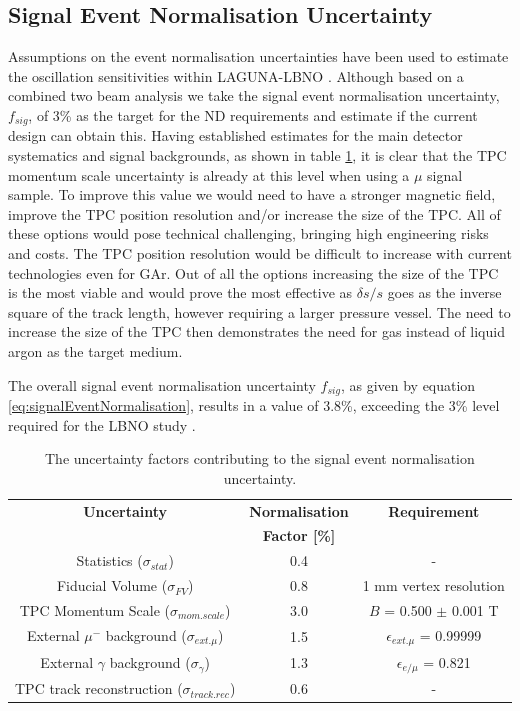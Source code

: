 \subsection{Signal Event Normalisation Uncertainty}
Assumptions on the event normalisation uncertainties have been used to estimate the oscillation sensitivities within LAGUNA-LBNO \cite{lbnoSignNormUncertainty}. Although based on a combined two beam analysis we take the signal event normalisation uncertainty, $f_{sig}$, of 3\% as the target for the ND requirements and estimate if the current design can obtain this. Having established estimates for the main detector systematics and signal backgrounds, as shown in table \ref{tab:detectorSystematicsSignal}, it is clear that the TPC momentum scale uncertainty is already at this level when using a $\mu$ signal sample. To improve this value we would need to have a stronger magnetic field, improve the TPC position resolution and/or increase the size of the TPC. All of these options would pose technical challenging, bringing high engineering risks and costs. The TPC position resolution would be difficult to increase with current technologies even for GAr. Out of all the options increasing the size of the TPC is the most viable and would prove the most effective as $\delta{s}/s$ goes as the inverse square of the track length, however requiring a larger pressure vessel. The need to increase the size of the TPC then demonstrates the need for gas instead of liquid argon as the target medium.

The overall signal event normalisation uncertainty $f_{sig}$, as given by equation \ref{eq:signalEventNormalisation}, results in a value of 3.8\%, exceeding the 3\% level required for the LBNO study \cite{lbnoSignNormUncertainty}. 

\begin{table}[htbp]
\centering
\begin{tabular}{ccc}
	\hline
	 \textbf{Uncertainty} & \textbf{Normalisation} & \textbf{Requirement}\\
	 & \textbf{Factor [\%]} & \\
	 \hline
	Statistics ($\sigma_{stat}$) & 0.4 & - \\
	Fiducial Volume ($\sigma_{FV}$) & 0.8 & 1 mm vertex resolution\\
	TPC Momentum Scale ($\sigma_{mom.scale}$) & 3.0 & $B$ = 0.500 $\pm$ 0.001 T\\
	External $\mu^{-}$ background ($\sigma_{ext. \mu}$) & 1.5 & $\epsilon_{ext. \mu}$ = 0.99999\\
	External $\gamma$ background ($\sigma_{\gamma}$) & 1.3 & $\epsilon_{e/\mu}$ = 0.821 \\
	TPC track reconstruction ($\sigma_{track.rec}$) & 0.6 & - \\
	\hline
\end{tabular}
\caption{The uncertainty factors contributing to the signal event normalisation uncertainty.}
\label{tab:detectorSystematicsSignal}
\end{table}

